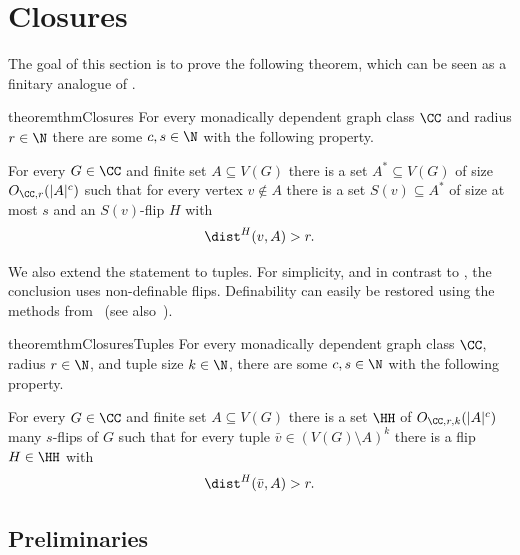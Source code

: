 \section{Closures}\label{sec:closures}
The goal of this section is to prove the following theorem, which can be seen as a finitary analogue of \cite[Theorem~7.1 in the full version]{flippers}.

\begin{restatable}{theorem}{thmClosures}\label{thm:closures}
For every monadically dependent graph class $\CC$ and radius $r\in\N$ there are some $c,s\in\N$ with the following property.

\smallskip\noindent
For every $G \in \CC$ and finite set $A \subseteq V(G)$ there is a set $A^*\subseteq V(G)$ of size $O_{\CC,r}(|A|^c)$ such that for every vertex $v \notin A$ there is a set $S(v)\subseteq A^*$ of size at most $s$
and an $S(v)$-flip $H$ with
\[
    \dist^H(v,A) > r.
\]
\end{restatable}

We also extend the statement to tuples.
For simplicity, and in contrast to , the conclusion uses non-definable flips.
Definability can easily be restored using the methods from~\cite{DBLP:conf/lics/BonnetDGKMST22} (see also~\cite{bonnet2025separability-icalp}).

\begin{restatable}{theorem}{thmClosuresTuples}\label{thm:closuresTuples}
For every monadically dependent graph class $\CC$, radius $r\in\N$, and tuple size $k \in \N$, there are some $c,s\in\N$ with the following property.

\smallskip\noindent
For every $G \in \CC$ and finite set $A \subseteq V(G)$ there is a set $\HH$ of $O_{\CC,r,k}(|A|^c)$ many $s$-flips of $G$ such that for every tuple $\bar v \in (V(G) \setminus A)^k$ there is a flip $H \in \HH$ with
\[
    \dist^H(\bar v,A) > r.
\]
\end{restatable}

\subsection{Preliminaries}

